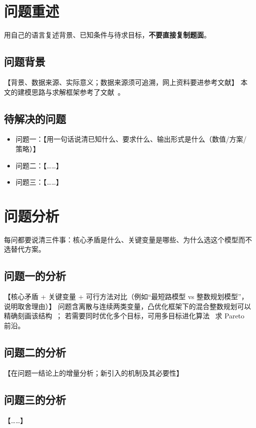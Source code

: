 \documentclass[12pt,a4paper,fontset=windows]{ctexart}
\begin{document}
\section{问题重述}
用自己的语言复述背景、已知条件与待求目标，\textbf{不要直接复制题面}。

\subsection{问题背景}
【背景、数据来源、实际意义；数据来源须可追溯，网上资料要进参考文献】
本文的建模思路与求解框架参考了文献~\cite{jiang2018model,si2021algorithm}。

\subsection{待解决的问题}
\begin{itemize}
  \item 问题一：【用一句话说清已知什么、要求什么、输出形式是什么（数值/方案/策略）】
  \item 问题二：【……】
  \item 问题三：【……】
\end{itemize}

\section{问题分析}
每问都要说清三件事：核心矛盾是什么、关键变量是哪些、为什么选这个模型而不选替代方案。

\subsection{问题一的分析}
【核心矛盾 + 关键变量 + 可行方法对比（例如“最短路模型 vs 整数规划模型”，说明取舍理由）】
问题含离散与连续两类变量，凸优化框架下的混合整数规划可以精确刻画该结构~\cite{boyd2004convex}；
若需要同时优化多个目标，可用多目标进化算法~\cite{deb2002nsga2} 求 Pareto 前沿。

\subsection{问题二的分析}
【在问题一结论上的增量分析；新引入的机制及其必要性】

\subsection{问题三的分析}
【……】
\end{document}
